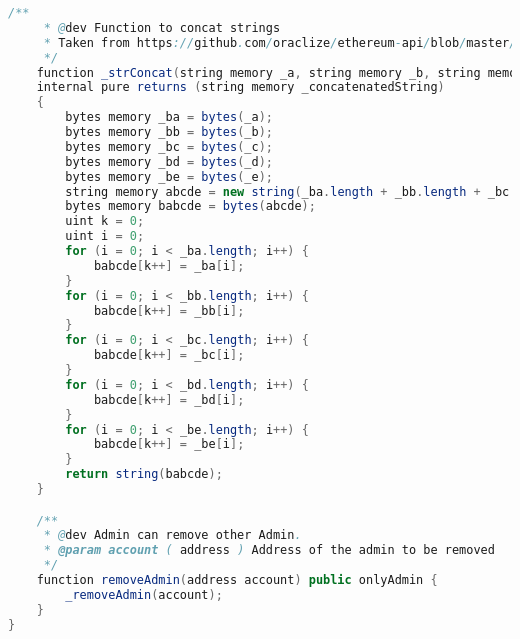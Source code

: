 \documentclass[MSE,Master,english]{twbook}%
\begin{document}
\begin{lstlisting}[language=Java, name={POAP Smart Contract}, label={sc:poapContract}]
    /**
     * @dev Function to concat strings
     * Taken from https://github.com/oraclize/ethereum-api/blob/master/oraclizeAPI_0.5.sol
     */
    function _strConcat(string memory _a, string memory _b, string memory _c, string memory _d, string memory _e)
    internal pure returns (string memory _concatenatedString)
    {
        bytes memory _ba = bytes(_a);
        bytes memory _bb = bytes(_b);
        bytes memory _bc = bytes(_c);
        bytes memory _bd = bytes(_d);
        bytes memory _be = bytes(_e);
        string memory abcde = new string(_ba.length + _bb.length + _bc.length + _bd.length + _be.length);
        bytes memory babcde = bytes(abcde);
        uint k = 0;
        uint i = 0;
        for (i = 0; i < _ba.length; i++) {
            babcde[k++] = _ba[i];
        }
        for (i = 0; i < _bb.length; i++) {
            babcde[k++] = _bb[i];
        }
        for (i = 0; i < _bc.length; i++) {
            babcde[k++] = _bc[i];
        }
        for (i = 0; i < _bd.length; i++) {
            babcde[k++] = _bd[i];
        }
        for (i = 0; i < _be.length; i++) {
            babcde[k++] = _be[i];
        }
        return string(babcde);
    }

    /**
     * @dev Admin can remove other Admin.
     * @param account ( address ) Address of the admin to be removed
     */
    function removeAdmin(address account) public onlyAdmin {
        _removeAdmin(account);
    }
}
\end{lstlisting}
\end{document}
